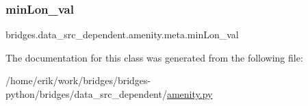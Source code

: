 \subsubsection{\texorpdfstring{min\+Lon\+\_\+val}{minLon\_val}}
{\footnotesize\ttfamily bridges.\+data\+\_\+src\+\_\+dependent.\+amenity.\+meta.\+min\+Lon\+\_\+val}



The documentation for this class was generated from the following file\+:\begin{DoxyCompactItemize}
\item 
/home/erik/work/bridges/bridges-\/python/bridges/data\+\_\+src\+\_\+dependent/\hyperlink{amenity_8py}{amenity.\+py}\end{DoxyCompactItemize}
